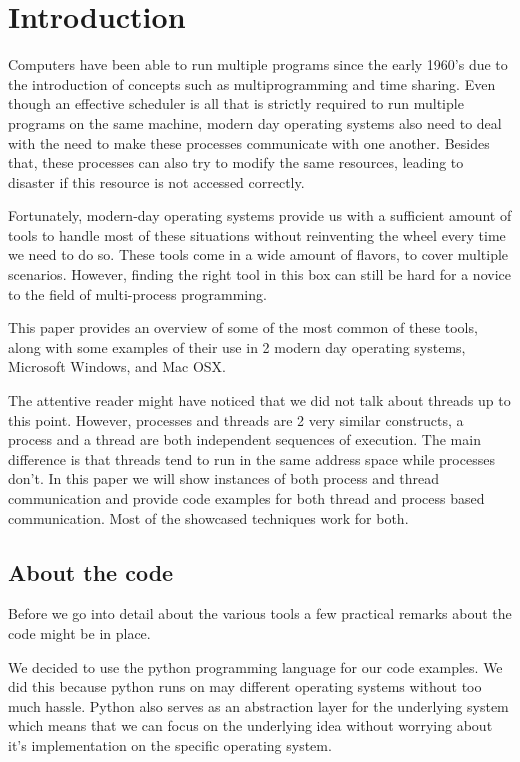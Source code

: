 
\section{Introduction}
Computers have been able to run multiple programs since the early 1960's due to the introduction of concepts such as multiprogramming and time sharing. Even though an effective scheduler is all that is strictly required to run multiple programs on the same machine, modern day operating systems also need to deal with the need to make these processes communicate with one another. Besides that, these processes can also try to modify the same resources, leading to disaster if this resource is not accessed correctly.

Fortunately, modern-day operating systems provide us with a sufficient amount of tools to handle most of these situations without reinventing the wheel every time we need to do so. These tools come in a wide amount of flavors, to cover multiple scenarios. However, finding the right tool in this box can still be hard for a novice to the field of multi-process programming.

This paper provides an overview of some of the most common of these tools, along with some examples of their use in 2 modern day operating systems, Microsoft Windows, and Mac OSX. 

The attentive reader might have noticed that we did not talk about threads up to this point. However, processes and threads are 2 very similar constructs, a process and a thread are both independent sequences of execution. The main difference is that threads tend to run in the same address space while processes don't. In this paper we will show instances of both process and thread communication and provide code examples for both thread and process based communication. Most of the showcased techniques work for both.

\subsection*{About the code}

Before we go into detail about the various tools a few practical remarks about the code might be in place.

We decided to use the python \cite{python} programming language for our code examples. We did this because python runs on may different operating systems without too much hassle. Python also serves as an abstraction layer for the underlying system which means that we can focus on the underlying idea without worrying about it's implementation on the specific operating system. 

